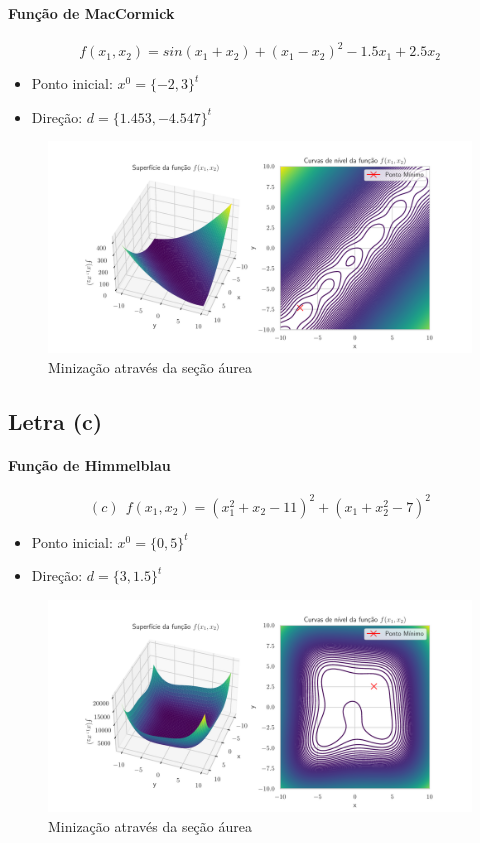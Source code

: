 \documentclass[12pt]{article}
\begin{document}
\paragraph{Função de MacCormick}

\begin{equation}
    f(x_{1}, x_{2}) = sin(x_{1}+x_{2}) + (x_{1}-x_{2})^{2}-1.5x_{1}+2.5x_{2}
\end{equation}

\begin{itemize}
    \item Ponto inicial: $x^{0} = \{-2,3\}^{t}$
    \item Direção: $d = \{1.453, -4.547\}^{t}$
\end{itemize}

\begin{figure}[H]
    \centering
    \includegraphics[scale = 0.6]{figures/questao_2b.pdf}
    \caption{Minização através da seção áurea}
\end{figure}

\subsection{Letra (c)}

\paragraph{Função de Himmelblau}

\begin{equation}
(c) ~~ f(x_{1}, x_{2}) = (x_{1}^{2}+x_{2}-11)^{2} + (x_{1}+x_{2}^{2}-7)^{2}
\end{equation}

\begin{itemize}
    \item Ponto inicial: $x^{0}=\{0,5\}^{t}$
    \item Direção: $d=\{3,1.5\}^{t}$
\end{itemize}

\begin{figure}[H]
    \centering
    \includegraphics[scale = 0.6]{figures/questao_2c.pdf}
    \caption{Minização através da seção áurea}
\end{figure}
\end{document}
